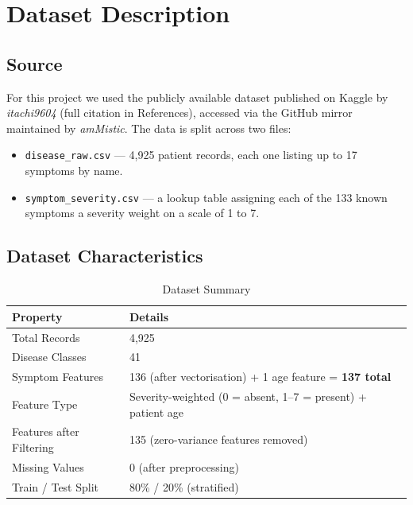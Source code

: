 \documentclass[12pt,a4paper]{article}
\begin{document}
\section{Dataset Description}

\subsection{Source}
For this project we used the publicly available dataset published on Kaggle by \textit{itachi9604} (full citation in References), accessed via the GitHub mirror maintained by \textit{amMistic}. The data is split across two files:

\begin{itemize}
    \item \texttt{disease\_raw.csv} --- 4,925 patient records, each one listing up to 17 symptoms by name.
    \item \texttt{symptom\_severity.csv} --- a lookup table assigning each of the 133 known symptoms a severity weight on a scale of 1 to 7.
\end{itemize}

\subsection{Dataset Characteristics}

\begin{table}[H]
\centering
\caption{Dataset Summary}
\begin{tabular}{ll}
\toprule
\textbf{Property} & \textbf{Details} \\
\midrule
Total Records       & 4,925 \\
Disease Classes     & 41 \\
Symptom Features    & 136 (after vectorisation) + 1 age feature = \textbf{137 total} \\
Feature Type        & Severity-weighted (0 = absent, 1--7 = present) + patient age \\
Features after Filtering & 135 (zero-variance features removed) \\
Missing Values      & 0 (after preprocessing) \\
Train / Test Split  & 80\% / 20\% (stratified) \\
\bottomrule
\end{tabular}
\end{table}
\end{document}
